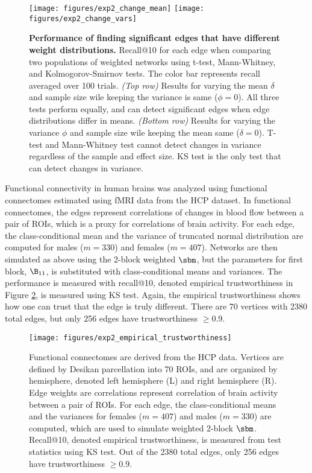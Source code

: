 \begin{figure}
    \texttt{[image: figures/exp2\_change\_mean]}
    \texttt{[image: figures/exp2\_change\_vars]}
    \caption{
    \textbf{Performance of finding significant edges that have different weight distributions.}
    Recall@10 for each edge when comparing two populations of weighted networks using t-test, Mann-Whitney, and Kolmogorov-Smirnov tests. The color bar represents recall averaged over 100 trials. 
    \textit{(Top row)} Results for varying the mean $\delta$ and sample size wile keeping the variance is same ($\phi = 0$). All three tests perform equally, and can detect significant edges when edge distributions differ in means.
    \textit{(Bottom row)} Results for varying the variance $\phi$ and sample size wile keeping the mean same ($\delta = 0$). T-test and Mann-Whitney test cannot detect changes in variance regardless of the sample and effect size. KS test is the only test that can detect changes in variance.}
    \label{fig:exp2}
\end{figure}

Functional connectivity in human brains was analyzed using functional connectomes estimated using fMRI data from the HCP dataset. In functional connectomes, the edges represent correlations of changes in blood flow between a pair of ROIs, which is a proxy for correlations of brain activity. For each edge, the class-conditional mean and the variance of truncated normal distribution are computed for males ($m=330$) and females ($m=407$). Networks are then simulated as above using the 2-block weighted $\sbm$, but the parameters for first block, $\B_{11}$, is substituted with class-conditional means and variances. The performance is measured with recall@10, denoted empirical trustworthiness in Figure \ref{fig:exp2_hcp}, is measured using KS test. Again, the empirical trustworthiness shows how one can trust that the edge is truly different. There are 70 vertices with 2380 total edges, but only 256 edges have trustworthiness $\geq 0.9$.

\begin{figure}
    \centering
    \texttt{[image: figures/exp2\_empirical\_trustworthiness]}
    \caption{
    Functional connectomes are derived from the HCP data. Vertices are defined by Desikan parcellation into 70 ROIs, and are organized by hemisphere, denoted left hemisphere (L) and right hemisphere (R). Edge weights are correlations represent correlation of brain activity between a pair of ROIs. 
    For each edge, the class-conditional means and the variances for females ($m=407$) and males ($m=330$) are computed, which are used to simulate weighted 2-block $\sbm$. Recall@10, denoted empirical trustworthiness, is measured from test statistics using KS test. Out of the 2380 total edges, only 256 edges have trustworthiness $\geq 0.9$. 
    }
    \label{fig:exp2_hcp}
\end{figure}


